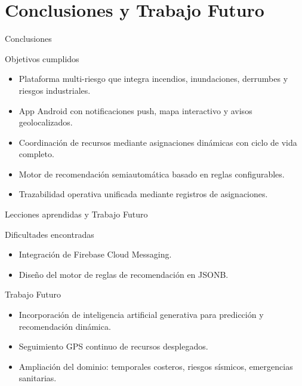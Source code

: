 \section{Conclusiones y Trabajo Futuro}

    \begin{frame}[c,shrink]{Conclusiones}
        \begin{block}{Objetivos cumplidos}
            \begin{itemize}
                \item Plataforma multi-riesgo que integra incendios, inundaciones, derrumbes y riesgos industriales.
                \item App Android con notificaciones push, mapa interactivo y avisos geolocalizados.
                \item Coordinación de recursos mediante asignaciones dinámicas con ciclo de vida completo.
                \item Motor de recomendación semiautomática basado en reglas configurables.
                \item Trazabilidad operativa unificada mediante registros de asignaciones.
            \end{itemize}
        \end{block}
    \end{frame}

    \begin{frame}[c,shrink]{Lecciones aprendidas y Trabajo Futuro} 
        \begin{block}{Dificultades encontradas}
            \begin{itemize}
                \item Integración de Firebase Cloud Messaging.
                \item Diseño del motor de reglas de recomendación en JSONB.
            \end{itemize}
        \end{block}
        
        \begin{block}{Trabajo Futuro}
            \begin{itemize}
                \item Incorporación de inteligencia artificial generativa para predicción y recomendación dinámica.
                \item Seguimiento GPS continuo de recursos desplegados.
                \item Ampliación del dominio: temporales costeros, riesgos sísmicos, emergencias sanitarias.
            \end{itemize}
        \end{block}
    \end{frame}
